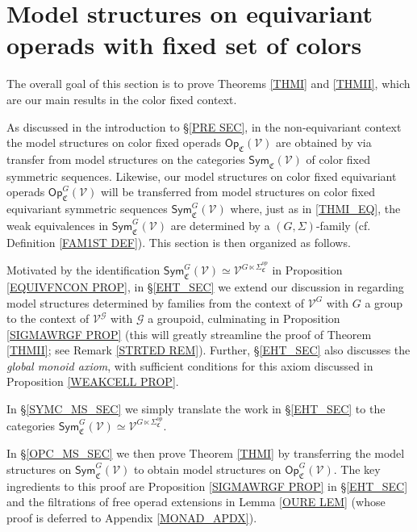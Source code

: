 \documentclass[a4paper,10pt
,draft
]{article}%
\numberwithin{equation}{section}
\numberwithin{figure}{section}
\theoremstyle{definition} %
\newcommand{\V}{\ensuremath{\mathcal V}}
\newcommand{\G}{\ensuremath{\mathcal G}}
\newcommand{\1}{\ensuremath{\mathbbm 1}}%
\begin{document}
\section{Model structures on equivariant operads with fixed set of colors}\label{FIXCOL SEC}


The overall goal of this section is to prove 
Theorems \ref{THMI} and \ref{THMII},
which are our main results in the color fixed context.

As discussed in the introduction to \S \ref{PRE SEC},
in the non-equivariant context the model structures on 
color fixed operads $\mathsf{Op}_{\mathfrak{C}}(\V)$
are obtained by via transfer from model structures on the categories
$\mathsf{Sym}_{\mathfrak{C}}(\V)$
of color fixed symmetric sequences.
Likewise, our model structures 
on color fixed equivariant operads 
$\mathsf{Op}^G_{\mathfrak{C}}(\V)$
will be transferred from model structures on 
color fixed equivariant symmetric sequences
$\mathsf{Sym}^G_{\mathfrak{C}}(\V)$
where, just as in \eqref{THMI_EQ},
the weak equivalences in 
$\mathsf{Sym}^G_{\mathfrak{C}}(\V)$
are determined by a $(G,\Sigma)$-family
(cf. Definition \ref{FAM1ST DEF}).
This section is then organized as follows.

Motivated by the identification
$\mathsf{Sym}^{G}_{\mathfrak{C}}(\V)
\simeq \V^{G \ltimes \Sigma^{op}_{\mathfrak{C}}}$
in Proposition \ref{EQUIVFNCON PROP}, 
in \S \ref{EHT_SEC}
we extend our discussion 
in \cite[\S 6]{BP_geo}
regarding model structures determined by families
from the context of $\V^G$ with $G$ a group to the context of
$\V^{\G}$ with $\G$ a groupoid,
culminating in Proposition \ref{SIGMAWRGF PROP}
(this will greatly streamline the proof of Theorem \ref{THMII}; see Remark \ref{STRTED REM}).
Further, \S \ref{EHT_SEC}
also discusses the \emph{global monoid axiom}, 
with sufficient conditions for this axiom discussed in 
Proposition \ref{WEAKCELL PROP}.

In \S \ref{SYMC_MS_SEC} we simply translate
the work in \S \ref{EHT_SEC} to the categories 
$\mathsf{Sym}^{G}_{\mathfrak{C}}(\V)
\simeq \V^{G \ltimes \Sigma^{op}_{\mathfrak{C}}}$.

In \S \ref{OPC_MS_SEC}
we then prove Theorem \ref{THMI} by transferring the model structures on 
$\mathsf{Sym}^{G}_{\mathfrak{C}}(\V)$ to obtain model structures on
$\mathsf{Op}^{G}_{\mathfrak{C}}(\V)$.
The key ingredients to this proof are
Proposition \ref{SIGMAWRGF PROP} in \S \ref{EHT_SEC} and
the filtrations of free operad extensions 
in Lemma \ref{OURE LEM}
(whose proof is deferred to Appendix \ref{MONAD_APDX}).
\end{document}
